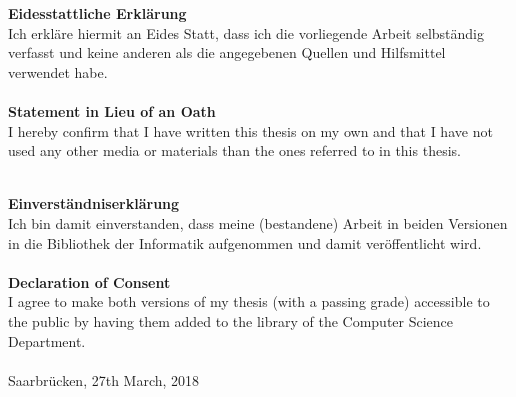 \textbf{Eidesstattliche Erklärung}
\\

Ich erkläre hiermit an Eides Statt, dass ich die vorliegende Arbeit selbständig verfasst und keine anderen als die angegebenen Quellen und Hilfsmittel verwendet habe.
\\\\

\textbf{Statement in Lieu of an Oath}
\\

I hereby confirm that I have written this thesis on my own and that I have not
used any other media or materials than the ones referred to in this thesis.
\\\\

\monthword{\month} \the\year

\vspace{5cm}

\textbf{Einverständniserklärung}
\\

Ich bin damit einverstanden, dass meine (bestandene) Arbeit in beiden Versionen
in die Bibliothek der Informatik aufgenommen und damit veröffentlicht wird.
\\\\

\textbf{Declaration of Consent}
\\

I agree to make both versions of my thesis (with a passing grade) accessible to the
public by having them added to the library of the Computer Science Department.
\\\\

Saarbrücken, 27th March, 2018